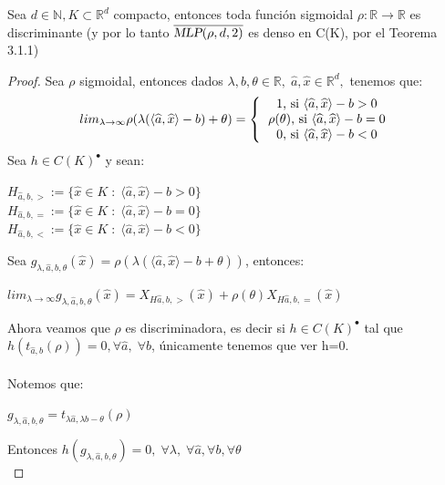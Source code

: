\documentclass[12pt,a4paper]{book}
\providecommand{\inp}[1]{\langle#1\rangle}
\providecommand{\conj}[1]{\lbrace#1\rbrace}
\providecommand{\mlp}[1]{\textsl{MLP}(\rho,d,#1)}
\begin{document}
\begin{proposicion}{}{}
Sea $d\in\mathbb{N},K\subset\mathbb{R}^{d}$ compacto, entonces toda función sigmoidal $\rho:\mathbb{R}\rightarrow\mathbb{R}$ es discriminante (y por lo tanto $\overline{\mlp{2}}$ es denso en C(K), por el Teorema 3.1.1)
\end{proposicion}
\begin{proof}
Sea $\rho$ sigmoidal, entonces dados $\lambda,b,\theta\in\mathbb{R},\;\widehat{a},\widehat{x}\in\mathbb{R}^{d},$ tenemos que:
\begin{equation*}
lim_{\lambda\rightarrow\infty}\rho(\lambda(\inp{\widehat{a},\widehat{x}}-b)+\theta)=\left\lbrace
\begin{tabular}{c}
1, si $\inp{\widehat{a},\widehat{x}}-b>0$ \\
$\rho(\theta)$, si $\inp{\widehat{a},\widehat{x}}-b=0$\\ 
0, si $\inp{\widehat{a},\widehat{x}}-b<0$ \\ 
\end{tabular}
\right.
\end{equation*}
Sea $h\in C(K)^{\bullet}$ y sean:
\begin{center}
$H_{\widehat{a},b,>}:=\conj{\widehat{x}\in K\;:\;\inp{\widehat{a},\widehat{x}}-b>0}
$\\
$H_{\widehat{a},b,=}:=\conj{\widehat{x}\in K\;:\;\inp{\widehat{a},\widehat{x}}-b=0}$\\
$H_{\widehat{a},b,<}:=\conj{\widehat{x}\in K\;:\;\inp{\widehat{a},\widehat{x}}-b<0}$
\end{center}
Sea $g_{\lambda,\widehat{a},b,\theta}(\widehat{x})=\rho(\lambda(\inp{\widehat{a},\widehat{x}}-b+\theta))$, entonces:
\begin{center}
$lim_{\lambda\rightarrow\infty}g_{\lambda,\widehat{a},b,\theta}(\widehat{x})=X_{H\widehat{a},b,>}(\widehat{x})+\rho(\theta)X_{H\widehat{a},b,=}(\widehat{x})$
\end{center}
Ahora veamos que $\rho$ es discriminadora, es decir si $h\in C(K)^{\bullet}$ tal que $h(t_{\widehat{a},b}(\rho))=0,\forall \widehat{a},\;\forall b$, únicamente tenemos que ver h=0.\\
\\
Notemos que:
\begin{center}
$g_{\lambda,\widehat{a},b,\theta}=t_{\lambda \widehat{a},\lambda b-\theta}(\rho)$
\end{center}
Entonces $h(g_{\lambda,\widehat{a},b,\theta})=0,\;\forall \lambda,\;\forall\widehat{a},\forall b,\forall\theta$\\

\end{proof}
\end{document}
